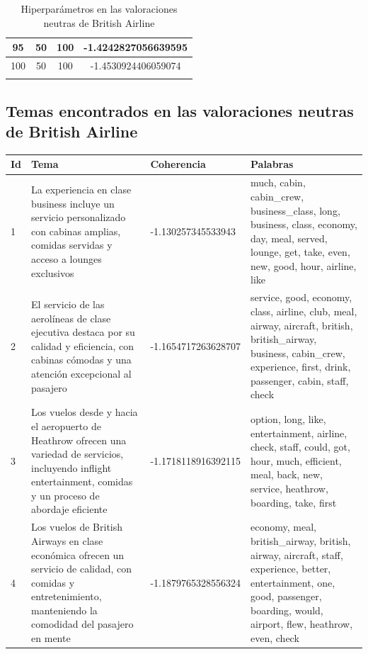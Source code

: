 \documentclass{report}
\begin{document}
{\begin{longtable}{|c|c|c|c|}
                    95 & 50 & 100 & -1.4242827056639595 \\
                    \hline
                    100 & 50 & 100 & -1.4530924406059074 \\
                    \hline
                    \caption{Hiperparámetros en las valoraciones neutras de British Airline}
                \end{longtable}
            \clearpage\subsection{Temas encontrados en las valoraciones neutras de British Airline}
                \label{tab:temas_british_airline_neutras}
                \begin{longtable}{|p{1cm}|p{4cm}|p{4cm}|p{6cm}|}
                    \hline
                    \textbf{Id} & \textbf{Tema} & \textbf{Coherencia} & \textbf{Palabras} \\
                    \hline
                    1 & La experiencia en clase business incluye un servicio personalizado con cabinas amplias, comidas servidas y acceso a lounges exclusivos & -1.130257345533943 & much, cabin, cabin\_crew, business\_class, long, business, class, economy, day, meal, served, lounge, get, take, even, new, good, hour, airline, like \\
                    \hline
                    2 & El servicio de las aerolíneas de clase ejecutiva destaca por su calidad y eficiencia, con cabinas cómodas y una atención excepcional al pasajero & -1.1654717263628707 & service, good, economy, class, airline, club, meal, airway, aircraft, british, british\_airway, business, cabin\_crew, experience, first, drink, passenger, cabin, staff, check \\
                    \hline
                    3 & Los vuelos desde y hacia el aeropuerto de Heathrow ofrecen una variedad de servicios, incluyendo inflight entertainment, comidas y un proceso de abordaje eficiente & -1.1718118916392115 & option, long, like, entertainment, airline, check, staff, could, got, hour, much, efficient, meal, back, new, service, heathrow, boarding, take, first \\
                    \hline
                    4 & Los vuelos de British Airways en clase económica ofrecen un servicio de calidad, con comidas y entretenimiento, manteniendo la comodidad del pasajero en mente & -1.1879765328556324 & economy, meal, british\_airway, british, airway, aircraft, staff, experience, better, entertainment, one, good, passenger, boarding, would, airport, flew, heathrow, even, check \\

\end{longtable}}
\end{document}

